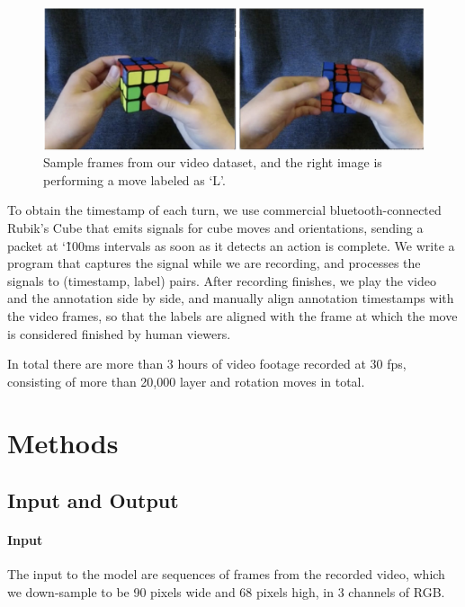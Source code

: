 \documentclass[10pt,twocolumn,letterpaper]{article}
\begin{document}
\begin{figure}[H]
    \centering
    \includegraphics[scale=0.15]{recording_setup.png}
    \caption{Sample frames from our video dataset, and the right image is performing a move labeled as ‘L’.}
    \label{fig:recording_setup}
\end{figure}

To obtain the timestamp of each turn, we use commercial bluetooth-connected Rubik's Cube that emits signals for cube moves and orientations, sending a packet at \char`\~100ms intervals as soon as it detects an action is complete. We write a program that captures the signal while we are recording, and processes the signals to (timestamp, label) pairs. After recording finishes, we play the video and the annotation side by side, and manually align annotation timestamps with the video frames, so that the labels are aligned with the frame at which the move is considered finished by human viewers. 
 
In total there are more than 3 hours of video footage recorded at 30 fps, consisting of more than 20,000 layer and rotation moves in total.


\section{Methods}


\subsection{Input and Output}

\paragraph{Input} The input to the model are sequences of frames from the recorded video, which we down-sample to be 90 pixels wide and 68 pixels high, in 3 channels of RGB.
\end{document}
